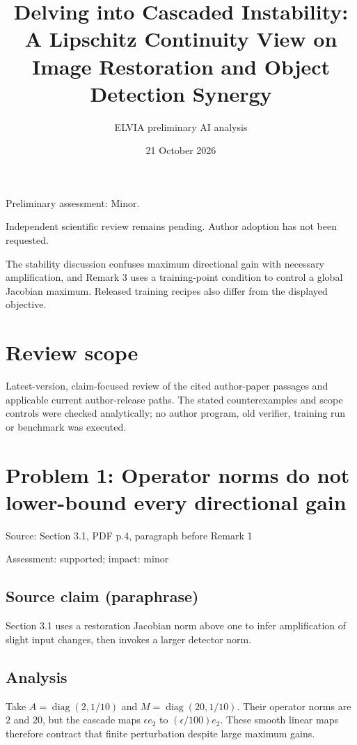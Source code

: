 \documentclass[11pt]{article}
\begin{document}
\title{Delving into Cascaded Instability: A Lipschitz Continuity View on Image Restoration and Object Detection Synergy}

\author{ELVIA preliminary AI analysis}\date{21 October 2026}\maketitle

Preliminary assessment: Minor.\par

Independent scientific review remains pending. Author adoption has not been requested.

The stability discussion confuses maximum directional gain with necessary amplification, and Remark 3 uses a training-point condition to control a global Jacobian maximum. Released training recipes also differ from the displayed objective.

\section*{Review scope}

Latest-version, claim-focused review of the cited author-paper passages and applicable current author-release paths. The stated counterexamples and scope controls were checked analytically; no author program, old verifier, training run or benchmark was executed.

\section*{Problem 1: Operator norms do not lower-bound every directional gain}

Source: Section 3.1, PDF p.4, paragraph before Remark 1

Assessment: supported; impact: minor

\subsection*{Source claim (paraphrase)}

Section 3.1 uses a restoration Jacobian norm above one to infer amplification of slight input changes, then invokes a larger detector norm.

\subsection*{Analysis}

Take \(A=\operatorname{diag}(2,1/10)\) and \(M=\operatorname{diag}(20,1/10)\). Their operator norms are \(2\) and \(20\), but the cascade maps \(\epsilon e_2\) to \((\epsilon/100)e_2\). These smooth linear maps therefore contract that finite perturbation despite large maximum gains.
\end{document}
